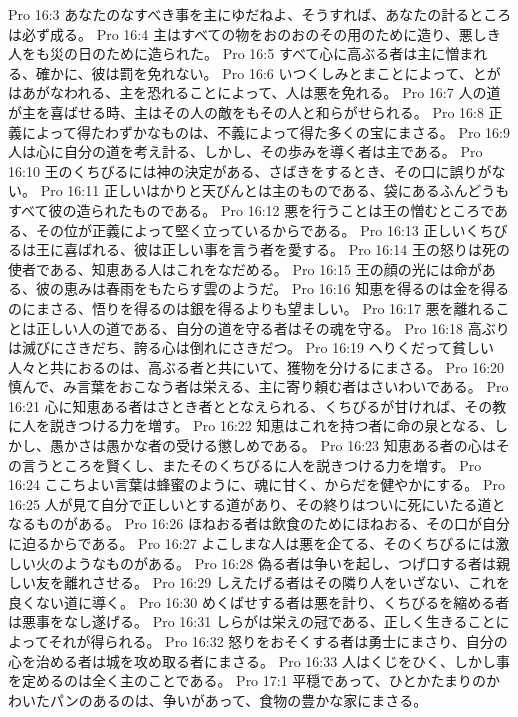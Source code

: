 Pro 16:3  あなたのなすべき事を主にゆだねよ、そうすれば、あなたの計るところは必ず成る。
Pro 16:4  主はすべての物をおのおのその用のために造り、悪しき人をも災の日のために造られた。
Pro 16:5  すべて心に高ぶる者は主に憎まれる、確かに、彼は罰を免れない。
Pro 16:6  いつくしみとまことによって、とがはあがなわれる、主を恐れることによって、人は悪を免れる。
Pro 16:7  人の道が主を喜ばせる時、主はその人の敵をもその人と和らがせられる。
Pro 16:8  正義によって得たわずかなものは、不義によって得た多くの宝にまさる。
Pro 16:9  人は心に自分の道を考え計る、しかし、その歩みを導く者は主である。
Pro 16:10  王のくちびるには神の決定がある、さばきをするとき、その口に誤りがない。
Pro 16:11  正しいはかりと天びんとは主のものである、袋にあるふんどうもすべて彼の造られたものである。
Pro 16:12  悪を行うことは王の憎むところである、その位が正義によって堅く立っているからである。
Pro 16:13  正しいくちびるは王に喜ばれる、彼は正しい事を言う者を愛する。
Pro 16:14  王の怒りは死の使者である、知恵ある人はこれをなだめる。
Pro 16:15  王の顔の光には命がある、彼の恵みは春雨をもたらす雲のようだ。
Pro 16:16  知恵を得るのは金を得るのにまさる、悟りを得るのは銀を得るよりも望ましい。
Pro 16:17  悪を離れることは正しい人の道である、自分の道を守る者はその魂を守る。
Pro 16:18  高ぶりは滅びにさきだち、誇る心は倒れにさきだつ。
Pro 16:19  へりくだって貧しい人々と共におるのは、高ぶる者と共にいて、獲物を分けるにまさる。
Pro 16:20  慎んで、み言葉をおこなう者は栄える、主に寄り頼む者はさいわいである。
Pro 16:21  心に知恵ある者はさとき者ととなえられる、くちびるが甘ければ、その教に人を説きつける力を増す。
Pro 16:22  知恵はこれを持つ者に命の泉となる、しかし、愚かさは愚かな者の受ける懲しめである。
Pro 16:23  知恵ある者の心はその言うところを賢くし、またそのくちびるに人を説きつける力を増す。
Pro 16:24  ここちよい言葉は蜂蜜のように、魂に甘く、からだを健やかにする。
Pro 16:25  人が見て自分で正しいとする道があり、その終りはついに死にいたる道となるものがある。
Pro 16:26  ほねおる者は飲食のためにほねおる、その口が自分に迫るからである。
Pro 16:27  よこしまな人は悪を企てる、そのくちびるには激しい火のようなものがある。
Pro 16:28  偽る者は争いを起し、つげ口する者は親しい友を離れさせる。
Pro 16:29  しえたげる者はその隣り人をいざない、これを良くない道に導く。
Pro 16:30  めくばせする者は悪を計り、くちびるを縮める者は悪事をなし遂げる。
Pro 16:31  しらがは栄えの冠である、正しく生きることによってそれが得られる。
Pro 16:32  怒りをおそくする者は勇士にまさり、自分の心を治める者は城を攻め取る者にまさる。
Pro 16:33  人はくじをひく、しかし事を定めるのは全く主のことである。
Pro 17:1  平穏であって、ひとかたまりのかわいたパンのあるのは、争いがあって、食物の豊かな家にまさる。
